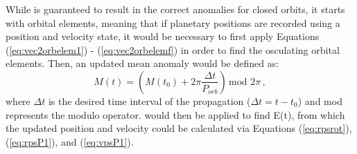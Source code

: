 While  is guaranteed to result in the correct anomalies for closed orbits, it starts with orbital elements, meaning that if planetary positions are recorded using a position and velocity state, it would be necessary to first apply Equations  (\ref{eq:vec2orbelem1}) - (\ref{eq:vec2orbelemf}) in order to find the osculating orbital elements.  Then, an updated mean anomaly would be defined as:
\begin{equation}
M(t) = \left(M(t_0) + 2\pi\frac{\Delta t}{P_{orb}}\right) \,\mathrm{mod}\,\, 2\pi \,,
\end{equation}
where $\Delta t$ is the desired time interval of the propagation ($\Delta t = t - t_0$) and mod represents the modulo operator.   would then be applied to find E(t), from which the updated position and velocity could be calculated via Equations (\ref{eq:rpsrot}), (\ref{eq:rpsP1}), and (\ref{eq:vpsP1}).

